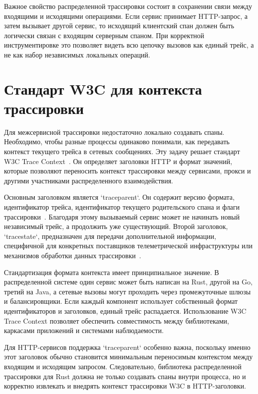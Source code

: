 Важное свойство распределенной трассировки состоит в сохранении связи между
входящими и исходящими операциями. Если сервис принимает HTTP-запрос, а затем
вызывает другой сервис, то исходящий клиентский спан должен быть логически связан
с входящим серверным спаном. При корректной инструментировке это позволяет видеть
всю цепочку вызовов как единый трейс, а не как набор независимых локальных
операций.

\section{Стандарт W3C для контекста трассировки}

Для межсервисной трассировки недостаточно локально создавать спаны. Необходимо,
чтобы разные процессы одинаково понимали, как передавать контекст текущего трейса в
сетевых сообщениях. Эту задачу решает стандарт W3C Trace Context~\cite{w3cTraceContext}.
Он определяет заголовки HTTP и формат значений, которые позволяют переносить
контекст трассировки между сервисами, прокси и другими участниками распределенного
взаимодействия.

Основным заголовком является `traceparent`. Он содержит версию формата,
идентификатор трейса, идентификатор текущего родительского спана и флаги
трассировки~\cite{w3cTraceContext}. Благодаря этому вызываемый сервис может не
начинать новый независимый трейс, а продолжить уже существующий. Второй
заголовок, `tracestate`, предназначен для передачи дополнительной информации,
специфичной для конкретных поставщиков телеметрической инфраструктуры или
механизмов обработки данных трассировки~\cite{w3cTraceContext}.

Стандартизация формата контекста имеет принципиальное значение. В распределенной
системе один сервис может быть написан на Rust, другой на Go, третий на Java, а
сетевые вызовы могут проходить через промежуточные шлюзы и балансировщики.
Если каждый компонент использует собственный формат идентификаторов и заголовков,
единый трейс распадается. Использование W3C Trace Context позволяет обеспечить
совместимость между библиотеками, каркасами приложений и системами
наблюдаемости.

Для HTTP-сервисов поддержка `traceparent` особенно важна, поскольку именно этот
заголовок обычно становится минимальным переносимым контекстом между входящим и
исходящим запросом. Следовательно, библиотека распределенной трассировки для Rust
должна не только создавать спаны внутри процесса, но и корректно извлекать и
внедрять контекст трассировки W3C в HTTP-заголовки.


